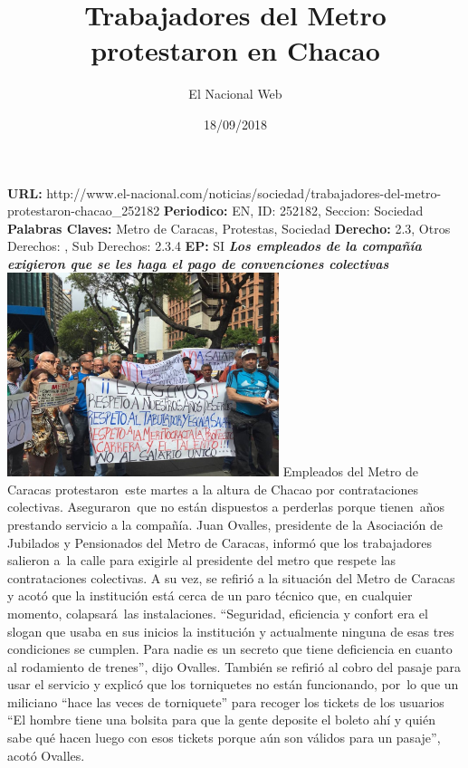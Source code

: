 \documentclass{article}%
\title{\textbf{Trabajadores del Metro protestaron en Chacao}}%
\author{El Nacional Web}%
\date{18/09/2018}%
\begin{document}
%
\normalsize%
\maketitle%
\textbf{URL: }%
http://www.el{-}nacional.com/noticias/sociedad/trabajadores{-}del{-}metro{-}protestaron{-}chacao\_252182\newline%
%
\textbf{Periodico: }%
EN, %
ID: %
252182, %
Seccion: %
Sociedad\newline%
%
\textbf{Palabras Claves: }%
Metro de Caracas, Protestas, Sociedad\newline%
%
\textbf{Derecho: }%
2.3, %
Otros Derechos: %
, %
Sub Derechos: %
2.3.4\newline%
%
\textbf{EP: }%
SI\newline%
\newline%
%
\textbf{\textit{Los empleados de la compañía exigieron que se les haga el pago de convenciones colectivas}}%
\newline%
\newline%
%
\includegraphics[width=300px]{109.jpg}%
\newline%
%
Empleados del Metro de Caracas protestaron~este martes a la altura de Chacao por contrataciones colectivas. Aseguraron~que no están dispuestos a perderlas porque tienen~años prestando servicio a la compañía.%
\newline%
%
Juan Ovalles, presidente de la Asociación de Jubilados y Pensionados del Metro de Caracas, informó que los trabajadores salieron a~la calle para exigirle al presidente del metro que respete las contrataciones colectivas.%
\newline%
%
A su vez, se refirió a la situación del Metro de Caracas y acotó que la institución está cerca de un paro técnico que, en cualquier momento, colapsará~las instalaciones.%
\newline%
%
“Seguridad, eficiencia y confort era el slogan que usaba en sus inicios la institución y actualmente ninguna de esas tres condiciones se cumplen. Para nadie es un secreto que tiene deficiencia en cuanto al rodamiento de trenes”, dijo Ovalles.%
\newline%
%
También se refirió al cobro del pasaje para usar el servicio y explicó que los torniquetes no están funcionando, por~lo que un miliciano “hace las veces de torniquete” para recoger los tickets de los usuarios%
\newline%
%
“El hombre tiene una bolsita para que la gente deposite el boleto ahí y quién sabe qué hacen luego con esos tickets porque aún son válidos para un pasaje”, acotó Ovalles.%
\newline%
%
\end{document}
